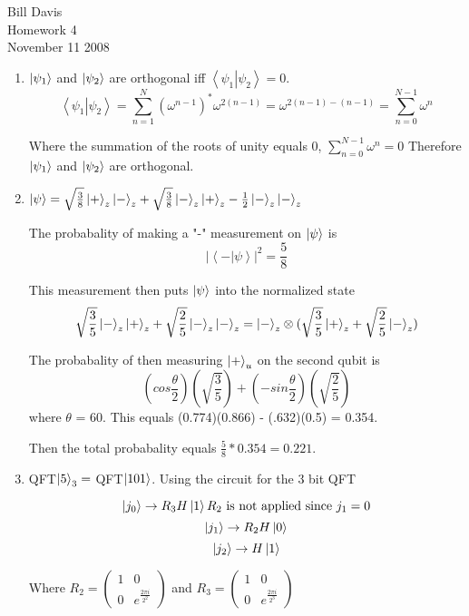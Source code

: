 \documentclass[11pt,fleqn]{article}
\begin{document}
\newcommand{\mbf}[1]{\mbox{{\bfseries #1}}}
\newcommand{\N}{\mbf{N}}
\renewcommand{\O}{\mbf{O}}

\newcommand{\braket}[2]{\left \langle #1 \right. \left | #2 \right \rangle}

\noindent Bill Davis \\
Homework 4 \\
November 11 2008

\begin{enumerate}
\item %
$\left\vert{\psi_1}\right\rangle$ and $\left\vert{\psi_2}\right\rangle$ are orthogonal iff $\braket{\psi_1}{\psi_2} = 0$.
\[
\braket{\psi_1}{\psi_2} = \sum_{n=1}^{N} (\omega^{n-1})^* \omega^{2(n-1)} = 
 \omega^{2(n-1) - (n-1)} = \sum_{n=0}^{N-1} \omega^{n}
\]

Where the summation of the roots of unity equals 0, $ \sum_{n=0}^{N-1} \omega^{n} = 0$ Therefore $\left\vert{\psi_1}\right\rangle$ and $\left\vert{\psi_2}\right\rangle$ are orthogonal.	
\item %
$\left\vert{\psi}\right\rangle = \sqrt{\frac{3}{8}}\left\vert{+}\right\rangle_z\left\vert{-}\right\rangle_z+\sqrt{\frac{3}{8}}\left\vert{-}\right\rangle_z\left\vert{+}\right\rangle_z - \frac{1}{2}\left\vert{-}\right\rangle_z\left\vert{-}\right\rangle_z$

The probabality of making a "-" measurement on $\left\vert{\psi}\right\rangle$ is 
\[
|\braket{-}{\psi}|^2 = \frac{5}{8}
\]

This measurement then puts $\left\vert{\psi}\right\rangle$ into the normalized state 
\[
\sqrt{\frac{3}{5}}\left\vert{-}\right\rangle_z\left\vert{+}\right\rangle_z + \sqrt{\frac{2}{5}}\left\vert{-}\right\rangle_z\left\vert{-}\right\rangle_z = 
\left\vert{-}\right\rangle_z \otimes (\sqrt{\frac{3}{5}}\left\vert{+}\right\rangle_z + \sqrt{\frac{2}{5}}\left\vert{-}\right\rangle_z)
\]

The probabality of then measuring $\left\vert{+}\right\rangle_u$ on the second qubit is 
\[
 (cos \frac{\theta}{2})(\sqrt{\frac{3}{5}} ) +
(-sin \frac{\theta}{2})(\sqrt{\frac{2}{5}})
\] 
where $\theta$ = 60. This equals (0.774)(0.866) - (.632)(0.5) = 0.354. 

Then the total probabality equals $\frac{5}{8}*0.354 = 0.221$.
\item %
QFT$\left\vert{5}\right\rangle_3 = $ QFT$\left\vert{101}\right\rangle$. Using the circuit for the 3 bit QFT

\[
\ket{j_0} \rightarrow R_3H\ket{1} \\ R_2 $ is not applied since $ j_1 = 0
\]
\[
\left\vert{j_1}\right\rangle \rightarrow R_2H\left\vert{0}\right\rangle 
\]
\[
\left\vert{j_2}\right\rangle \rightarrow H\left\vert{1}\right\rangle
\]

Where 
$R_2 = \left( \begin{array}{cc}
						1 & 0   \\
						0 & e^{\frac{2\pi i}{2^2}}  \end{array} \right)$ and 
$R_3 = \left( \begin{array}{cc}
						1 & 0   \\
						0 & e^{\frac{2\pi i}{2^3}}  \end{array} \right)$ 


\end{enumerate}
\end{document}

